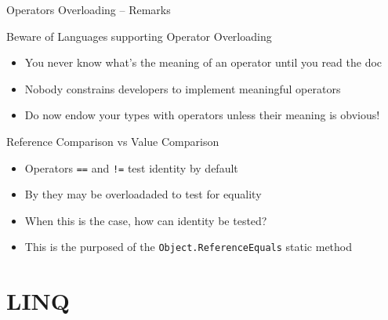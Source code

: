 \documentclass[presentation]{beamer}
\begin{document}
\begin{frame}{Operators Overloading -- Remarks}
  \begin{alertblock}{Beware of Languages supporting Operator Overloading}
    \begin{itemize}
      \item You never know what's the meaning of an operator until you \alert{read the doc}
      \item Nobody constrains developers to implement \alert{meaningful} operators
      \item Do now endow your types with operators unless their meaning is \alert{obvious}!
    \end{itemize}
  \end{alertblock}

  \begin{exampleblock}{Reference Comparison vs Value Comparison}
    \begin{itemize}
      \item Operators \texttt{==} and \texttt{!=} test identity by default
      \item By they may be overloadaded to test for equality
      \item When this is the case, how can identity be tested?
      \item This is the purposed of the \texttt{Object.ReferenceEquals} static method
    \end{itemize}
  \end{exampleblock}
\end{frame}

\section{LINQ}
\end{document}
